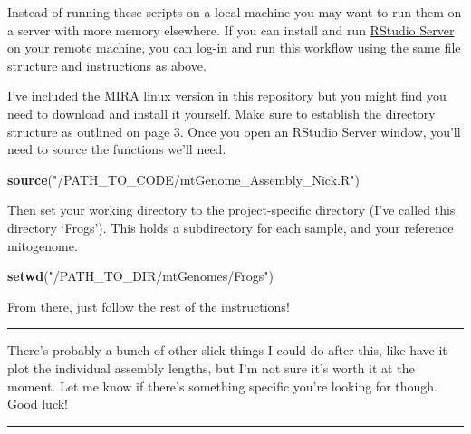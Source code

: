 \documentclass[
]{article}
\newenvironment{Shaded}{\begin{snugshade}}{\end{snugshade}}
\newcommand{\KeywordTok}[1]{\textcolor[rgb]{0.13,0.29,0.53}{\textbf{#1}}}
\newcommand{\NormalTok}[1]{#1}
\newcommand{\StringTok}[1]{\textcolor[rgb]{0.31,0.60,0.02}{#1}}
\begin{document}
Instead of running these scripts on a local machine you may want to run
them on a server with more memory elsewhere. If you can install and run
\href{https://www.rstudio.com/products/rstudio/download-server/}{RStudio
Server} on your remote machine, you can log-in and run this workflow
using the same file structure and instructions as above.

I've included the MIRA linux version in this repository but you might
find you need to download and install it yourself. Make sure to
establish the directory structure as outlined on page 3. Once you open
an RStudio Server window, you'll need to source the functions we'll
need.

\begin{Shaded}
\begin{Highlighting}[]
\KeywordTok{source}\NormalTok{(}\StringTok{"/PATH_TO_CODE/mtGenome_Assembly_Nick.R"}\NormalTok{)}
\end{Highlighting}
\end{Shaded}

Then set your working directory to the project-specific directory (I've
called this directory `Frogs'). This holds a subdirectory for each
sample, and your reference mitogenome.

\begin{Shaded}
\begin{Highlighting}[]
\KeywordTok{setwd}\NormalTok{(}\StringTok{"/PATH_TO_DIR/mtGenomes/Frogs"}\NormalTok{)}
\end{Highlighting}
\end{Shaded}

From there, just follow the rest of the instructions!

\begin{center}\rule{0.5\linewidth}{0.5pt}\end{center}

There's probably a bunch of other slick things I could do after this,
like have it plot the individual assembly lengths, but I'm not sure it's
worth it at the moment. Let me know if there's something specific you're
looking for though.\\
Good luck!

\begin{center}\rule{0.5\linewidth}{0.5pt}\end{center}
\end{document}
